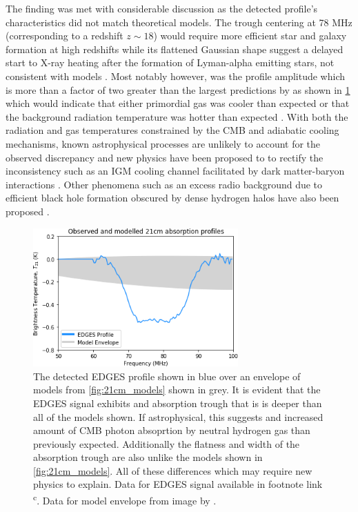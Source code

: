 The finding was met with considerable discussion as the detected profile’s characteristics did not match theoretical models. The trough centering at 78 MHz (corresponding to a redshift $z \sim 18$) would require more efficient star and galaxy formation at high redshifts \citep{edges_star_formation} while its flattened Gaussian shape suggest a delayed start to X-ray heating after the formation of Lyman-alpha emitting stars, not consistent with models \citep{theory_models}. Most notably however, was the profile amplitude which is more than a factor of two greater than the largest predictions by \citet{theory_models} as shown in \cref{fig:edges_signal} which would indicate that either primordial gas was cooler than expected or that the background radiation temperature was hotter than expected \citep{edgesNature}. With both the radiation and gas temperatures constrained by the CMB and adiabatic cooling mechanisms, known astrophysical processes are unlikely to account for the observed discrepancy and new physics have been proposed to to rectify the inconsistency such as an IGM cooling channel facilitated by dark matter-baryon interactions \citep{edgesNature}. Other phenomena such as an excess radio background due to efficient black hole formation obscured by dense hydrogen halos have also been proposed \citep{ew_radio_background}.
\begin{figure}
    \centering
    \includegraphics[width=0.7\textwidth]{edges_signal}
    \caption{The detected EDGES profile shown in blue \citep{edgesNature} over an envelope of models from \cref{fig:21cm_models} shown in grey. It is evident that the EDGES signal exhibits and absorption trough that is is deeper than all of the models shown. If astrophysical, this suggests and increased amount of CMB photon absoprtion by neutral hydrogen gas than previously expected. Additionally the flatness and width of the absorption trough are also unlike the models shown in \cref{fig:21cm_models}. All of these differences which may require new physics to explain. Data for EDGES signal available in footnote link \textsuperscript{c}. Data for model envelope from image by \citet{theory_models}.}
    \label{fig:edges_signal}
\end{figure}

